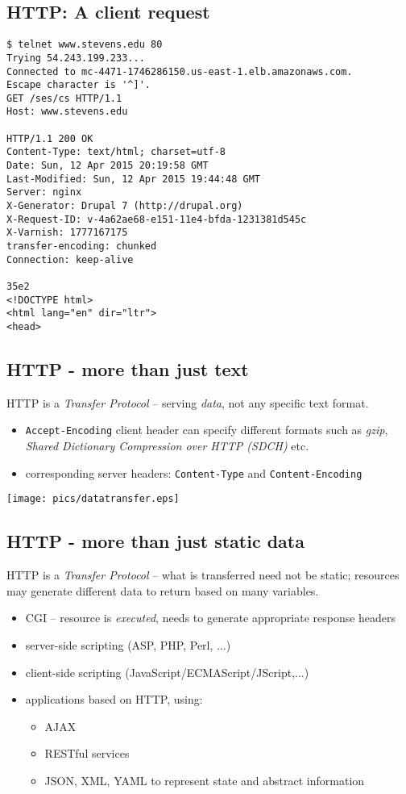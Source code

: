 \documentclass[xga]{xdvislides}
\begin{document}
\subsection{HTTP: A client request}
\smallish
\begin{verbatim}
$ telnet www.stevens.edu 80
Trying 54.243.199.233...
Connected to mc-4471-1746286150.us-east-1.elb.amazonaws.com.
Escape character is '^]'.
GET /ses/cs HTTP/1.1
Host: www.stevens.edu

HTTP/1.1 200 OK
Content-Type: text/html; charset=utf-8
Date: Sun, 12 Apr 2015 20:19:58 GMT
Last-Modified: Sun, 12 Apr 2015 19:44:48 GMT
Server: nginx
X-Generator: Drupal 7 (http://drupal.org)
X-Request-ID: v-4a62ae68-e151-11e4-bfda-1231381d545c
X-Varnish: 1777167175
transfer-encoding: chunked
Connection: keep-alive

35e2
<!DOCTYPE html>
<html lang="en" dir="ltr">
<head>
\end{verbatim}
\Normalsize

\subsection{HTTP - more than just text}
HTTP is a {\em Transfer Protocol} -- serving {\em data}, not any specific
text format.

\begin{itemize}
	\item {\tt Accept-Encoding} client header can specify different formats
		such as {\em gzip}, {\em Shared Dictionary Compression over HTTP (SDCH)} etc.
	\item corresponding server headers: {\tt Content-Type} and
		{\tt Content-Encoding}
\end{itemize}
\begin{center}
	\texttt{[image: pics/datatransfer.eps]}
\end{center}

\subsection{HTTP - more than just static data}
HTTP is a {\em Transfer Protocol} -- what is transferred need not be
static; resources may generate different data to return based on many
variables.

\begin{itemize}
	\item CGI -- resource is {\em executed}, needs to generate
		appropriate response headers
	\item server-side scripting (ASP, PHP, Perl, ...)
	\item client-side scripting (JavaScript/ECMAScript/JScript,...)
	\item applications based on HTTP, using:
		\begin{itemize}
			\item AJAX
			\item RESTful services
			\item JSON, XML, YAML to represent state and
				abstract information
		\end{itemize}
\end{itemize}
\end{document}
